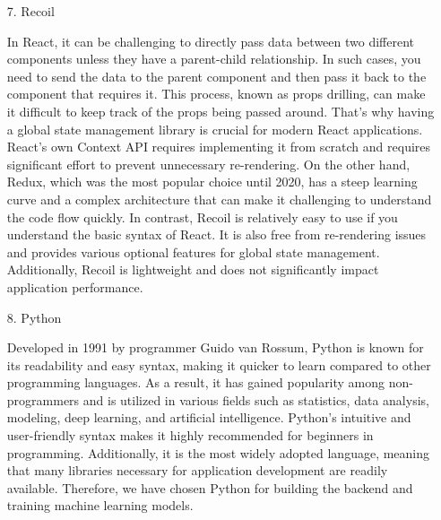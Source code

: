 \documentclass[conference, a4paper]{IEEEtran}
\begin{document}
\begin{enumerate}
\begin{enumerate}
        \item[7.]Recoil \cite{recoiljs}
        \item[]In React, it can be challenging to directly pass data between two different components unless they have a parent-child relationship. In such cases, you need to send the data to the parent component and then pass it back to the component that requires it. This process, known as props drilling, can make it difficult to keep track of the props being passed around. That's why having a global state management library is crucial for modern React applications. React's own Context API requires implementing it from scratch and requires significant effort to prevent unnecessary re-rendering. On the other hand, Redux, which was the most popular choice until 2020, has a steep learning curve and a complex architecture that can make it challenging to understand the code flow quickly. In contrast, Recoil is relatively easy to use if you understand the basic syntax of React. It is also free from re-rendering issues and provides various optional features for global state management. Additionally, Recoil is lightweight and does not significantly impact application performance.\\

        \item[8.]Python \cite{gabialibrary}
        \item[]Developed in 1991 by programmer Guido van Rossum, Python is known for its readability and easy syntax, making it quicker to learn compared to other programming languages. As a result, it has gained popularity among non-programmers and is utilized in various fields such as statistics, data analysis, modeling, deep learning, and artificial intelligence. Python's intuitive and user-friendly syntax makes it highly recommended for beginners in programming. Additionally, it is the most widely adopted language, meaning that many libraries necessary for application development are readily available. Therefore, we have chosen Python for building the backend and training machine learning models.\\


\end{enumerate}
\end{enumerate}
\end{document}
